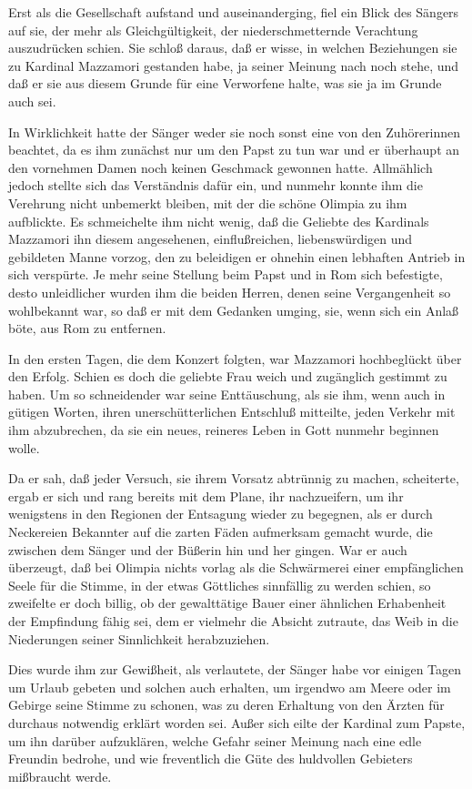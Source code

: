 Erst als die Gesellschaft aufstand und auseinanderging, fiel ein
Blick des Sängers auf sie, der mehr als Gleichgültigkeit, der
niederschmetternde Verachtung auszudrücken schien. Sie schloß
daraus, daß er wisse, in welchen Beziehungen sie zu Kardinal
Mazzamori gestanden habe, ja seiner Meinung nach noch stehe, und
daß er sie aus diesem Grunde für eine Verworfene halte, was sie ja
im Grunde auch sei.

In Wirklichkeit hatte der Sänger weder sie noch sonst eine von den
Zuhörerinnen beachtet, da es ihm zunächst nur um den Papst zu tun
war und er überhaupt an den vornehmen Damen noch keinen Geschmack
gewonnen hatte. Allmählich jedoch stellte sich das Verständnis
dafür ein, und nunmehr konnte ihm die Verehrung nicht unbemerkt
bleiben, mit der die schöne Olimpia zu ihm aufblickte. Es
schmeichelte ihm nicht wenig, daß die Geliebte des Kardinals
Mazzamori\pagenum{[87]} ihn diesem angesehenen, einflußreichen,
liebenswürdigen und gebildeten Manne vorzog, den zu beleidigen er
ohnehin einen lebhaften Antrieb in sich verspürte. Je mehr seine
Stellung beim Papst und in Rom sich befestigte, desto unleidlicher
wurden ihm die beiden Herren, denen seine Vergangenheit so
wohlbekannt war, so daß er mit dem Gedanken umging, sie, wenn sich
ein Anlaß böte, aus Rom zu entfernen.

In den ersten Tagen, die dem Konzert folgten, war Mazzamori
hochbeglückt über den Erfolg. Schien es doch die geliebte Frau
weich und zugänglich gestimmt zu haben. Um so schneidender war
seine Enttäuschung, als sie ihm, wenn auch in gütigen Worten, ihren
unerschütterlichen Entschluß mitteilte, jeden Verkehr mit ihm
abzubrechen, da sie ein neues, reineres Leben in Gott nunmehr
beginnen wolle.

Da er sah, daß jeder Versuch, sie ihrem Vorsatz abtrünnig zu
machen, scheiterte, ergab er sich und rang bereits mit dem Plane,
ihr nachzueifern, um ihr wenigstens in den Regionen der Entsagung
wieder zu begegnen, als er durch Neckereien Bekannter auf die
zarten Fäden aufmerksam gemacht wurde, die zwischen dem Sänger und
der Büßerin hin und her gingen. War er auch überzeugt, daß bei
Olimpia nichts vorlag als die Schwärmerei einer empfänglichen Seele
für die Stimme, in der etwas Göttliches sinnfällig zu werden
schien, so zweifelte er doch billig, ob der gewalttätige Bauer
einer ähnlichen Erhabenheit der Empfindung fähig sei, dem er
vielmehr die Absicht zutraute, das Weib in die Niederungen seiner
Sinnlichkeit herabzuziehen.

Dies wurde ihm zur Gewißheit, als verlautete, der Sänger habe vor
einigen Tagen um Urlaub gebeten und solchen auch erhalten, um
irgendwo am Meere oder im Gebirge seine Stimme zu schonen, was zu
deren Erhaltung von\pagenum{[88]} den Ärzten für durchaus
notwendig erklärt worden sei. Außer sich eilte der Kardinal zum
Papste, um ihn darüber aufzuklären, welche Gefahr seiner Meinung
nach eine edle Freundin bedrohe, und wie freventlich die Güte des
huldvollen Gebieters mißbraucht werde.

